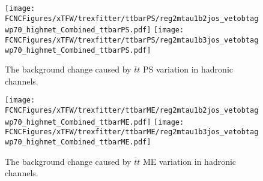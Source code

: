 



\begin{figure}[H]
\centering
\texttt{[image: \\FCNCFigures/xTFW/trexfitter/ttbarPS/reg2mtau1b2jos\_vetobtagwp70\_highmet\_Combined\_ttbarPS.pdf]}
\texttt{[image: \\FCNCFigures/xTFW/trexfitter/ttbarPS/reg2mtau1b3jos\_vetobtagwp70\_highmet\_Combined\_ttbarPS.pdf]}
\caption{The background change caused by $\bar{t}t$ PS variation in hadronic channels.}
\label{fig:xTFW_ttbarPS}
\end{figure}

\begin{figure}[H]
\centering
\texttt{[image: \\FCNCFigures/xTFW/trexfitter/ttbarME/reg2mtau1b2jos\_vetobtagwp70\_highmet\_Combined\_ttbarME.pdf]}
\texttt{[image: \\FCNCFigures/xTFW/trexfitter/ttbarME/reg2mtau1b3jos\_vetobtagwp70\_highmet\_Combined\_ttbarME.pdf]}
\caption{The background change caused by $\bar{t}t$ ME variation in hadronic channels.}
\label{fig:xTFW_ttbarME}
\end{figure}

